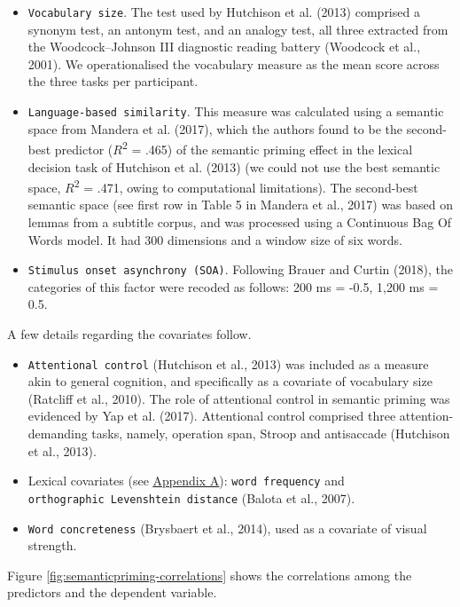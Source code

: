 \documentclass[
  12pt,
  man,floatsintext]{apa7}
\begin{document}
\begin{itemize}
\item
  \texttt{Vocabulary\ size}. The test used by Hutchison et al. (2013) comprised a synonym test, an antonym test, and an analogy test, all three extracted from the Woodcock--Johnson III diagnostic reading battery (Woodcock et al., 2001). We operationalised the vocabulary measure as the mean score across the three tasks per participant.
\item
  \texttt{Language-based\ similarity}. This measure was calculated using a semantic space from Mandera et al. (2017), which the authors found to be the second-best predictor (\(R\)\textsuperscript{2} = .465) of the semantic priming effect in the lexical decision task of Hutchison et al. (2013) (we could not use the best semantic space, \(R\)\textsuperscript{2} = .471, owing to computational limitations). The second-best semantic space (see first row in Table 5 in Mandera et al., 2017) was based on lemmas from a subtitle corpus, and was processed using a Continuous Bag Of Words model. It had 300 dimensions and a window size of six words.
\item
  \texttt{Stimulus\ onset\ asynchrony\ (SOA)}. Following Brauer and Curtin (2018), the categories of this factor were recoded as follows: 200 ms = -0.5, 1,200 ms = 0.5.
\end{itemize}

A few details regarding the covariates follow.

\begin{itemize}
\item
  \texttt{Attentional\ control} (Hutchison et al., 2013) was included as a measure akin to general cognition, and specifically as a covariate of vocabulary size (Ratcliff et al., 2010). The role of attentional control in semantic priming was evidenced by Yap et al. (2017). Attentional control comprised three attention-demanding tasks, namely, operation span, Stroop and antisaccade (Hutchison et al., 2013).
\item
  Lexical covariates (see \protect\hyperlink{appendix-A-lexical-covariates}{\underline{Appendix A}}): \texttt{word\ frequency} and \texttt{orthographic\ Levenshtein\ distance} (Balota et al., 2007).
\item
  \texttt{Word\ concreteness} (Brysbaert et al., 2014), used as a covariate of visual strength.
\end{itemize}

Figure \ref{fig:semanticpriming-correlations} shows the correlations among the predictors and the dependent variable.
\end{document}
